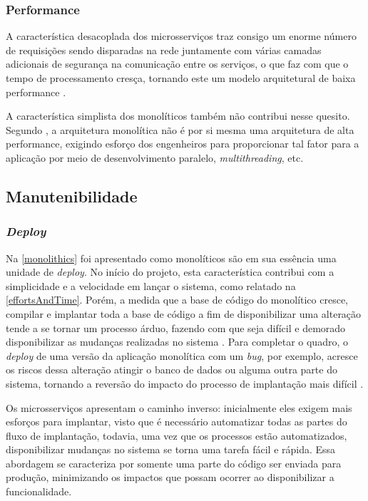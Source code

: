 \subsubsection{Performance}
\label{pers:performance}

A característica desacoplada dos microsserviços traz consigo um enorme número de requisições
sendo disparadas na rede juntamente com várias camadas adicionais de segurança na comunicação entre
os serviços, o que faz com que o tempo de processamento cresça, tornando este um modelo arquitetural
de baixa performance \cite{Richards2020:FundamentalsOfSoftwareArchitecture}.

A característica simplista dos monolíticos também não contribui nesse quesito. Segundo
, a arquitetura monolítica não é por si
mesma uma arquitetura de alta performance, exigindo esforço dos engenheiros para proporcionar
tal fator para a aplicação por meio de desenvolvimento paralelo, \textit{multithreading}, etc.

\subsection{Manutenibilidade}

\subsubsection{\textit{Deploy}}
\label{pers:deploy}

Na \autoref{monolithics} foi apresentado como monolíticos são em sua essência uma unidade de
\textit{deploy}. No início do projeto, esta característica contribui com a simplicidade e a
velocidade em lançar o sistema, como relatado na \autoref{effortsAndTime}. Porém, a medida que a
base de código do monolítico cresce, compilar e implantar toda a base de código a fim de
disponibilizar uma alteração tende a se tornar um processo árduo, fazendo com que seja difícil e
demorado disponibilizar as mudanças realizadas no sistema \cite{MartinFowler:Microservices}. Para
completar o quadro, o \textit{deploy} de uma versão da aplicação monolítica com um \textit{bug},
por exemplo, acresce os riscos dessa alteração atingir o banco de dados ou alguma outra parte do
sistema, tornando a reversão do impacto do processo de implantação mais difícil
\cite{Richards2020:FundamentalsOfSoftwareArchitecture}.

Os microsserviços apresentam o caminho inverso: inicialmente eles exigem mais esforços para
implantar, visto que é necessário automatizar todas as partes do fluxo de implantação, todavia, uma
vez que os processos estão automatizados, disponibilizar mudanças no sistema se torna uma tarefa
fácil e rápida. Essa abordagem se caracteriza por somente uma parte do código ser enviada para
produção, minimizando os impactos que possam ocorrer ao disponibilizar a funcionalidade.

